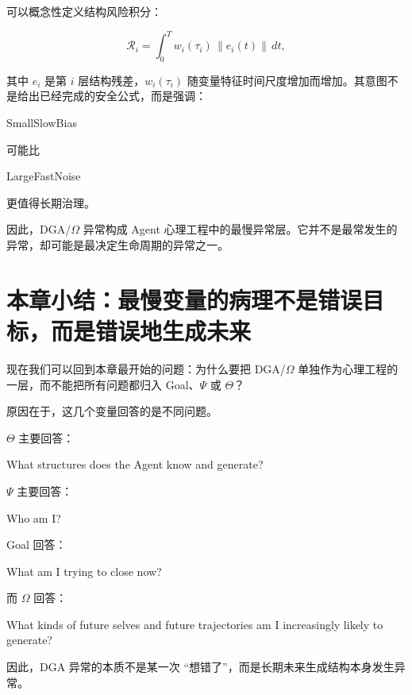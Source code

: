 可以概念性定义结构风险积分：

\[
\mathcal R_i
=
\int_0^T
w_i(\tau_i)
\,
\|e_i(t)\|
\,dt,
\]

其中 $e_i$ 是第 $i$ 层结构残差，$w_i(\tau_i)$ 随变量特征时间尺度增加而增加。其意图不是给出已经完成的安全公式，而是强调：

\begin{statementbox}
SmallSlowBias
\end{statementbox}

可能比

\begin{statementbox}
LargeFastNoise
\end{statementbox}

更值得长期治理。

因此，DGA/$\Omega$ 异常构成 Agent 心理工程中的最慢异常层。它并不是最常发生的异常，却可能是最决定生命周期的异常之一。

\section{本章小结：最慢变量的病理不是错误目标，而是错误地生成未来}
\label{sec:omega_chapter_summary}

现在我们可以回到本章最开始的问题：为什么要把 DGA/$\Omega$ 单独作为心理工程的一层，而不能把所有问题都归入 Goal、$\Psi$ 或 $\Theta$？

原因在于，这几个变量回答的是不同问题。

$\Theta$ 主要回答：

\begin{statementbox}
What structures does the Agent know and generate?
\end{statementbox}

$\Psi$ 主要回答：

\begin{statementbox}
Who am I?
\end{statementbox}

Goal 回答：

\begin{statementbox}
What am I trying to close now?
\end{statementbox}

而 $\Omega$ 回答：

\begin{statementbox}
What kinds of future selves and future trajectories am I increasingly likely to generate?
\end{statementbox}

因此，DGA 异常的本质不是某一次 ``想错了''，而是长期未来生成结构本身发生异常。

